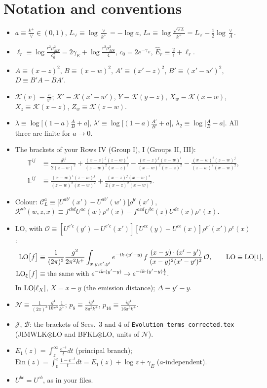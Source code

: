 \documentclass[10pt]{article}
\numberwithin{equation}{section}
\newcommand{\Lv}{L_{\vee}}
\newcommand{\Ls}{L_{*}}
\newcommand{\CL}{\mathcal C_L}
\newcommand{\Rc}{\mathcal R}
\newcommand{\OO}{\mathcal O}
\newcommand{\KK}{\mathcal K}
\newcommand{\JJ}{\mathcal J}
\newcommand{\BB}{\mathcal B}
\newcommand{\NN}{\mathcal N}
\newcommand{\Eh}{\hat E}
\newcommand{\LOx}[1]{{\rm LO}_\xi\big[#1\big]}
\newcommand{\pre}{\frac{1}{(2\pi)^3}}
\newcommand{\Ein}{\mathrm{Ein}}
\begin{document}
\section{Notation and conventions}\label{sec:notation}
\begin{itemize}
\item $a\equiv\frac{k^+}{\vee}\in(0,1)$, $\Lv\equiv\log\frac{\vee}{k^+}=-\log a$, $\Ls\equiv\log\frac{\sqrt{\vee\Lambda}}{k^+}=\Lv-\frac12\log\frac\vee\Lambda$.
\item $\ell_r\equiv\log\frac{r^2\mu^2_{\overline{MS}}}{c_0^2}=2\gamma_E+\log\frac{r^2\mu^2_{\overline{MS}}}{4}$, $c_0=2e^{-\gamma_E}$, $\Eh_r\equiv\frac{2}{\epsilon}+\ell_r$.
\item $A\equiv(x-z)^2$, $B\equiv(x-w)^2$, $A'\equiv(x'-z)^2$, $B'\equiv(x'-w')^2$, $D\equiv B'A-BA'$.
\item $\KK(v)\equiv\frac{v}{v^2}$; $X'\equiv\KK(x'-w')$, $Y\equiv\KK(y-z)$, $X_w\equiv\KK(x-w)$, $X_z\equiv\KK(x-z)$, $Z_w\equiv\KK(z-w)$.
\item $\lambda\equiv\log\big[(1-a)\frac{A}{B}+a\big]$, $\lambda'\equiv\log\big[(1-a)\frac{A'}{B'}+a\big]$, $\lambda_2\equiv\log\big|\frac{A}{B}-a\big|$. All three are finite for $a\to0$.
\item The brackets of your Rows IV (Group I), I (Groups II, III):
\begin{align*}
\mathbb T^{ij}&\equiv\frac{\delta^{ij}}{2(z-w)^2}+\frac{(x-z)^j(z-w)^i}{(z-w)^2(x-z)^2}-\frac{(x-z)^j(x-w)^i}{(x-w)^2(x-z)^2}-\frac{(x-w)^i(z-w)^j}{(z-w)^2(x-w)^2},\\
\mathbb L^{ij}&\equiv\frac{(x-w)^i(z-w)^j}{(z-w)^2(x-w)^2}+\frac{(x-z)^j(x-w)^i}{2(x-z)^2(x-w)^2}.
\end{align*}
\item Colour: $\CL^a\equiv\big[U^{ab'}(x')-U^{ab'}(w')\big]\rho^{b'}(x')$, $\Rc^{ab}(w,z,x)\equiv f^{cbd}U^{ac}(w)\rho^d(x)-f^{acd}U^{bc}(z)U^{de}(x)\rho^e(x)$.
\item LO, with $\OO\equiv[U^{e'c}(y')-U^{e'c}(x')][U^{ec}(y)-U^{ce}(x)]\rho^{e'}(x')\rho^e(x)$:
\begin{align*}
{\rm LO}\big[f\big]&\equiv\pre\frac{g^2}{2\pi^2k^+}\int_{x,y,x',y'}e^{-ik\cdot(y'-y)}\,f\,\frac{(x-y)\cdot(x'-y')}{(x-y)^2(x'-y')^2}\,\OO,\qquad {\rm LO}\equiv{\rm LO}[1],\\
\LOx{f}&\equiv\text{the same with }e^{-ik\cdot(y'-y)}\to e^{-ik\cdot(y'-y)\frac1\xi}.
\end{align*}
In ${\rm LO}[\ell_X]$, $X=x-y$ (the emission distance); $\Delta\equiv y'-y$.
\item $\NN\equiv\pre\frac{g^4}{16\pi^5}\frac{1}{k^+}$; $p_8\equiv\frac{ig^4}{8\pi^5k^+}$, $p_{16}\equiv\frac{ig^4}{16\pi^5k^+}$.
\item $\JJ$, $\BB$: the brackets of Secs.~3 and 4 of \texttt{Evolution\_terms\_corrected.tex} (JIMWLK$\otimes$LO and BFKL$\otimes$LO, units of $\NN$).
\item $E_1(z)=\int_z^\infty\frac{e^{-t}}{t}dt$ (principal branch); $\Ein(z)=\int_0^z\frac{1-e^{-t}}{t}dt=E_1(z)+\log z+\gamma_E$ ($a$-independent).
\item $U^{bc}=U^{cb}$, as in your files.
\end{itemize}
\end{document}
